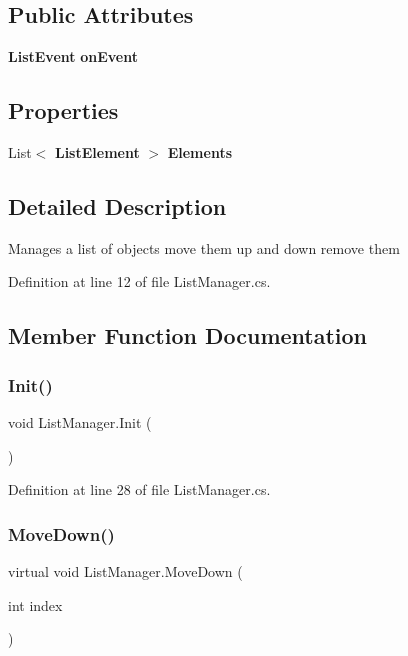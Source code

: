 \subsection*{Public Attributes}
\begin{DoxyCompactItemize}
\item 
\textbf{ List\+Event} \textbf{ on\+Event}
\end{DoxyCompactItemize}
\subsection*{Properties}
\begin{DoxyCompactItemize}
\item 
List$<$ \textbf{ List\+Element} $>$ \textbf{ Elements}\hspace{0.3cm}{\ttfamily  [get, set]}
\end{DoxyCompactItemize}


\subsection{Detailed Description}
Manages a list of objects move them up and down remove them 



Definition at line 12 of file List\+Manager.\+cs.



\subsection{Member Function Documentation}
\mbox{\label{class_list_manager_abbfd04f3710ffab77929672a9400a30a}} 
\subsubsection{Init()}
{\footnotesize\ttfamily void List\+Manager.\+Init (\begin{DoxyParamCaption}{ }\end{DoxyParamCaption})}



Definition at line 28 of file List\+Manager.\+cs.

\mbox{\label{class_list_manager_a7543efeedf5ea74bc06ac96a58b6edca}} 
\subsubsection{Move\+Down()}
{\footnotesize\ttfamily virtual void List\+Manager.\+Move\+Down (\begin{DoxyParamCaption}\item[{int}]{index }\end{DoxyParamCaption})\hspace{0.3cm}{\ttfamily [virtual]}}



